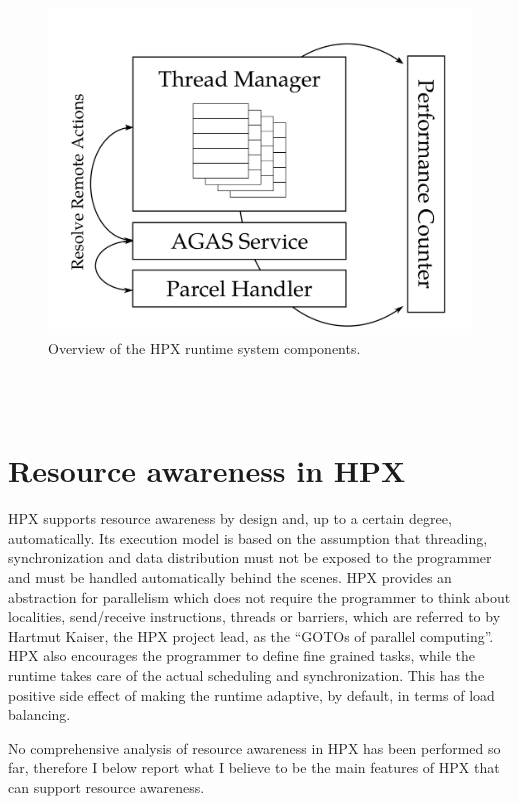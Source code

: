\begin{figure}[t]
 	\begin{center}
 		\includegraphics[scale=0.18]{Figures/hpxArchitecture.png}
 		\caption{Overview of the HPX runtime system components\cite{heller2017hpx}.}\label{fig:hpxArchitecture}
 	\end{center}
\end{figure}

~\\~
\section{Resource awareness in HPX} \label{sec:hpxRAC}
HPX supports resource awareness by design and, up to a certain degree, automatically.
Its execution model is based on the assumption that threading, synchronization and data distribution must not be exposed to the programmer and must be handled automatically behind the scenes. HPX provides an abstraction for parallelism which does not require the programmer to think about localities, send/receive instructions, threads or barriers, which are referred to by Hartmut Kaiser, the HPX project lead, as the ``GOTOs of parallel computing''\cite{kaiser2014goto}. HPX also encourages the programmer to define fine grained tasks, while the runtime takes care of the actual scheduling and synchronization. This has the positive side effect of making the runtime adaptive, by default, in terms of load balancing.

No comprehensive analysis of resource awareness in HPX has been performed so far, therefore I below report what I believe to be the main features of HPX that can support resource awareness.
~\\~

